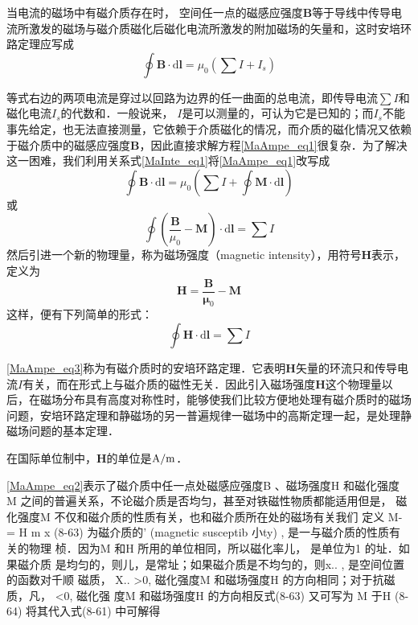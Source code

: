 

当电流的磁场中有磁介质存在时， 空间任一点的磁感应强度$\mathbf B $等于导线中传导电流所激发的磁场与磁介质磁化后磁化电流所激发的附加磁场的矢量和，这时安培环路定理应写成
\begin{equation} \label{MaAmpe_eq1}
\oint \mathbf{B} \cdot \mathrm{d} \mathbf{l}=\mu_{0}\left(\sum I+I_{s}\right)
\end{equation}

等式右边的两项电流是穿过以回路为边界的任一曲面的总电流，即传导电流$\sum I$和磁化电流$I_s$的代数和．一般说来， $I $是可以测量的，可认为它是已知的；而$I_s$不能事先给定，也无法直接测量，它依赖于介质磁化的情况，而介质的磁化情况又依赖于磁介质中的磁感应强度$\mathbf B$，因此直接求解方程\autoref{MaAmpe_eq1}很复杂．为了解决这一困难，我们利用关系式\autoref{MaInte_eq1}将\autoref{MaAmpe_eq1}改写成
\begin{equation}
\oint \mathbf{B} \cdot \mathrm{d} \mathbf{l}=\mu_{0}\left(\sum I+\oint \mathbf{M} \cdot \mathrm{d} \mathbf{l}\right)
\end{equation}
或
\begin{equation}
\oint\left(\frac{\mathbf{B}}{\mu_{0}}-\mathbf{M}\right) \cdot \mathrm{d} \mathbf{l}=\sum I
\end{equation}
然后引进一个新的物理量，称为磁场强度（magnetic intensity），用符号$\mathbf H$表示，定义为
\begin{equation} \label{MaAmpe_eq2}
\mathbf{H}=\frac{\mathbf{B}}{\mathbf{\mu}_{0}}-\mathbf{M}
\end{equation}
这样，便有下列简单的形式：
\begin{equation} \label{MaAmpe_eq3}
\oint \mathbf{H} \cdot \mathrm{d} \mathbf{l}=\sum I
\end{equation}

\autoref{MaAmpe_eq3}称为有磁介质时的安培环路定理．它表明$\mathbf H $矢量的环流只和传导电流$I $有关，而在形式上与磁介质的磁性无关．因此引入磁场强度$\mathbf H $这个物理量以后，在磁场分布具有高度对称性时，能够使我们比较方便地处理有磁介质时的磁场问题，安培环路定理和静磁场的另一普遍规律一磁场中的高斯定理一起，是处理静磁场问题的基本定理．

在国际单位制中，$\mathbf  H $的单位是$\rm A/m$．

\autoref{MaAmpe_eq2}表示了磁介质中任一点处磁感应强度B 、磁场强度H 和磁化强度
M 之间的普遍关系，不论磁介质是否均匀，甚至对铁磁性物质都能适用但是，
磁化强度M 不仅和磁介质的性质有关，也和磁介质所在处的磁场有关我们
定义
M-
= H m x
(8-63)
为磁介质的' (magnetic susceptib 小ty) , 是一与磁介质的性质有关的物理
桢．因为M 和H 所用的单位相同，所以磁化率儿， 是单位为1 的址．如果磁介质
是均匀的，则儿，是常址；如果磁介质是不均匀的，则x.. , 是空间位置的函数对千顺
磁质， X.. >0, 磁化强度M 和磁场强度H 的方向相同；对于抗磁质，凡， <0, 磁化强
度M 和磁场强度H 的方向相反式(8-63) 又可写为
M 于H (8-64)
将其代入式(8-61) 中可解得